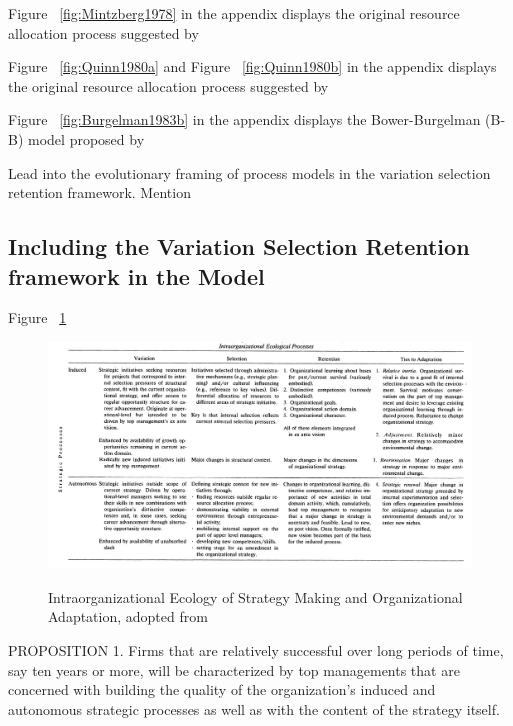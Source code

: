 \documentclass[12pt,letterpaper]{article}
\begin{document}
Figure ~\ref{fig:Mintzberg1978} in the appendix displays the original resource allocation process suggested by \cite{Mintzberg1978}

Figure ~\ref{fig:Quinn1980a} and Figure ~\ref{fig:Quinn1980b} in the appendix displays the original resource allocation process suggested by \cite{Quinn1980}

Figure ~\ref{fig:Burgelman1983b} in the appendix displays the Bower-Burgelman (B-B) model proposed by \cite{Burgelman1983b}

Lead into the evolutionary framing of process models in the variation selection retention framework. Mention \cite{Burgelman1991, Burgelman1994, Noda1996, Lovas2000}

\subsection{Including the Variation Selection Retention framework in the \cite{Burgelman1991, Burgelman1994} Model}

Figure ~\ref{fig:Burgelman1991}

\begin{figure}[h]
\begin{centering}
  \caption{Intraorganizational Ecology of Strategy Making and Organizational Adaptation, adopted from \cite{Burgelman1991}}
  \includegraphics[width=\textwidth]{Burgelman1991}
  \label{fig:Burgelman1991}
\end{centering}
\end{figure}

PROPOSITION 1. Firms that are relatively successful over long periods of time, say ten years or more, will be characterized by top managements that are concerned with building the quality of the organization's induced and autonomous strategic processes as well as with the content of the strategy itself.
\end{document}
